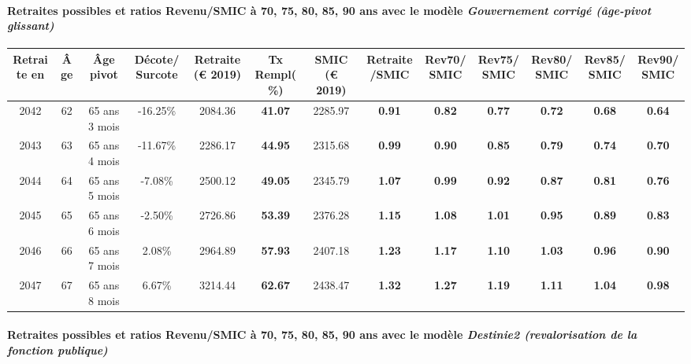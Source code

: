 \paragraph{Retraites possibles et ratios Revenu/SMIC à 70, 75, 80, 85, 90 ans avec le modèle \emph{Gouvernement corrigé (âge-pivot glissant)}}  
 
{ \scriptsize \begin{center} 
\begin{tabular}[htb]{|c|c||c|c||c|c||c||c|c|c|c|c|c|} 
\hline 
 Retraite en &  Âge &  Âge pivot &  Décote/Surcote &  Retraite (\euro{} 2019) &  Tx Rempl(\%) &  SMIC (\euro{} 2019) &  Retraite/SMIC &  Rev70/SMIC &  Rev75/SMIC &  Rev80/SMIC &  Rev85/SMIC &  Rev90/SMIC \\ 
\hline \hline 
 2042 &  62 &  65 ans 3 mois &  -16.25\% &  2084.36 &  {\bf 41.07} &  2285.97 &  {\bf {\color{red} 0.91}} &  {\bf {\color{red} 0.82}} &  {\bf {\color{red} 0.77}} &  {\bf {\color{red} 0.72}} &  {\bf {\color{red} 0.68}} &  {\bf {\color{red} 0.64}} \\ 
\hline 
 2043 &  63 &  65 ans 4 mois &  -11.67\% &  2286.17 &  {\bf 44.95} &  2315.68 &  {\bf {\color{red} 0.99}} &  {\bf {\color{red} 0.90}} &  {\bf {\color{red} 0.85}} &  {\bf {\color{red} 0.79}} &  {\bf {\color{red} 0.74}} &  {\bf {\color{red} 0.70}} \\ 
\hline 
 2044 &  64 &  65 ans 5 mois &  -7.08\% &  2500.12 &  {\bf 49.05} &  2345.79 &  {\bf 1.07} &  {\bf {\color{red} 0.99}} &  {\bf {\color{red} 0.92}} &  {\bf {\color{red} 0.87}} &  {\bf {\color{red} 0.81}} &  {\bf {\color{red} 0.76}} \\ 
\hline 
 2045 &  65 &  65 ans 6 mois &  -2.50\% &  2726.86 &  {\bf 53.39} &  2376.28 &  {\bf 1.15} &  {\bf 1.08} &  {\bf 1.01} &  {\bf {\color{red} 0.95}} &  {\bf {\color{red} 0.89}} &  {\bf {\color{red} 0.83}} \\ 
\hline 
 2046 &  66 &  65 ans 7 mois &  2.08\% &  2964.89 &  {\bf 57.93} &  2407.18 &  {\bf 1.23} &  {\bf 1.17} &  {\bf 1.10} &  {\bf 1.03} &  {\bf {\color{red} 0.96}} &  {\bf {\color{red} 0.90}} \\ 
\hline 
 2047 &  67 &  65 ans 8 mois &  6.67\% &  3214.44 &  {\bf 62.67} &  2438.47 &  {\bf 1.32} &  {\bf 1.27} &  {\bf 1.19} &  {\bf 1.11} &  {\bf 1.04} &  {\bf {\color{red} 0.98}} \\ 
\hline 
\hline 
\end{tabular} 
\end{center} } 
\paragraph{Retraites possibles et ratios Revenu/SMIC à 70, 75, 80, 85, 90 ans avec le modèle \emph{Destinie2 (revalorisation de la fonction publique)}}  
 
